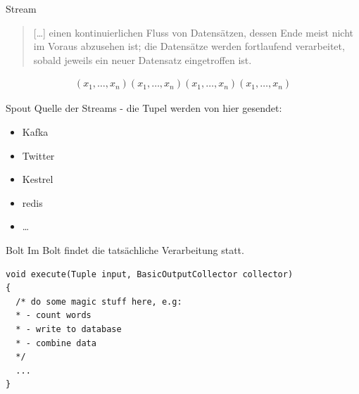 \documentclass{beamer}
\begin{document}
\begin{frame}[t]{Stream}
  \begin{quote}
    [\ldots] einen kontinuierlichen Fluss von Datensätzen, dessen Ende meist nicht im Voraus abzusehen ist; die Datensätze werden fortlaufend verarbeitet, sobald jeweils ein neuer Datensatz eingetroffen ist.
  \end{quote}

  \begin{align*}
    (x_1, \ldots , x_n)
    (x_1, \ldots , x_n)
    (x_1, \ldots , x_n)
    (x_1, \ldots , x_n)
  \end{align*}
  \begin{figure}
    \centering
    \vspace*{-1cm}
  \end{figure}
\end{frame}

\begin{frame}[t]{Spout}
  Quelle der Streams - die Tupel werden von hier gesendet: 
  \begin{itemize}
    \item Kafka 
    \item Twitter 
    \item Kestrel 
    \item redis
    \item \ldots
  \end{itemize}
\end{frame}

\begin{frame}[fragile]{Bolt}
  Im Bolt findet die tatsächliche Verarbeitung statt.
  \begin{lstlisting}
void execute(Tuple input, BasicOutputCollector collector)
{
  /* do some magic stuff here, e.g:
  * - count words
  * - write to database
  * - combine data
  */
  ...
}

  \end{lstlisting}
\end{frame}
\end{document}
